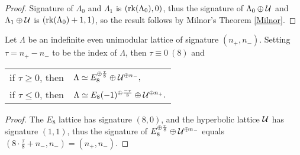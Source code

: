 \begin{proof}
    Signature of $\Lambda_0$ and $\Lambda_1$ is $(\operatorname{rk}(\Lambda_0), 0)$, thus the signature of $\Lambda_0 \oplus \mathcal U$ and $\Lambda_1 \oplus \mathcal U$ is $(\operatorname{rk}(\Lambda_0) + 1, 1)$, so the result follows by Milnor's Theorem \ref{Milnor}.
\end{proof}

\begin{corollary}
    Let $\Lambda$ be an indefinite even unimodular lattice of signature $(n_+, n_-)$. Setting $\tau = n_+ - n_-$ to be the index of $\Lambda$, then $\tau \equiv 0 \ (8)$ and
    \begin{center}
        \begin{tabular}{r l}
            if $\tau \geq 0$, then & $\Lambda \simeq E_8^{\oplus \frac{\tau}{8}} \oplus \mathcal U^{\oplus n_-},$ \\
            if $\tau \leq 0$, then & $\Lambda \simeq E_8(-1)^{\oplus \frac{-\tau}{8}} \oplus \mathcal U^{\oplus n_+}.$
        \end{tabular}
    \end{center}
\end{corollary}

\begin{proof}
    The $E_8$ lattice has signature $(8,0)$, and the hyperbolic lattice $\mathcal U$ has signature $(1,1)$, thus the signature of $E_8^{\oplus \frac{\tau}{8}} \oplus \mathcal U^{\oplus n_-}$ equals $(8\cdot \tfrac{\tau}{8} + n_-,n_-) = (n_+, n_-)$.
\end{proof}

